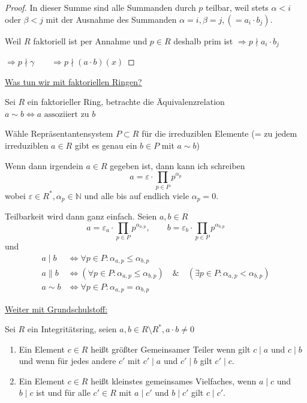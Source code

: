 \documentclass[12pt,parskip=full]{scrartcl}
\newcommand{\setN}{\mathbb{N}}
\newcommand{\heading}{\underline}
\theoremstyle{definition}
\theoremstyle{remark}
\begin{document}
\begin{proof}
		In dieser Summe sind alle Summanden durch $p$ teilbar, weil stets $\alpha < i$ oder $\beta < j$ mit der Ausnahme des Summanden $\alpha = i, \beta = j, (= a_i \cdot b_j)$.
		
		Weil $R$ faktoriell ist per Annahme und $p \in R$ deshalb prim ist $\Rightarrow p \nmid a_i \cdot b_j$
		
		$\Rightarrow p \nmid \gamma \qquad \Rightarrow p \nmid (a \cdot b)(x)$
	\end{proof}

	\heading{Was tun wir mit faktoriellen Ringen?}
	
	Sei $R$ ein faktorieller Ring, betrachte die Äquivalenzrelation $a \sim b \Leftrightarrow a \text{ assoziiert zu } b$
	
	Wähle Repräsentantensystem $P \subset R$ für die irreduziblen Elemente (= zu jedem irreduziblen $a \in R$ gibt es genau ein $b \in P$ mit $a \sim b$)
	
	Wenn dann irgendein $a \in R$ gegeben ist, dann kann ich schreiben
	\begin{equation*}
		a = \varepsilon \cdot \prod_{p \in P} p^{\alpha_p}
	\end{equation*}
	wobei $\varepsilon \in R^*, \alpha_p \in \setN$ und alle bis auf endlich viele $\alpha_p = 0$.
	
	Teilbarkeit wird dann ganz einfach. Seien $a, b \in R$
	\begin{equation*}
		a = \varepsilon_a \cdot \prod_{p \in P} p^{\alpha_{a,p}}, \qquad b = \varepsilon_b \cdot \prod_{p \in P} p^{\alpha_{b,p}}
	\end{equation*}
	und
	\begin{align*}
		a \mid b &\Leftrightarrow \forall p \in P: \alpha_{a,p} \leq \alpha_{b,p} \\
		a \parallel b &\Leftrightarrow (\forall p \in P: \alpha_{a,p} \leq \alpha_{b,p}) \quad\&\quad (\exists p \in P: \alpha_{a,p} < \alpha_{b,p})\\
		a \sim b &\Leftrightarrow \forall p \in P: \alpha_{a,p} = \alpha_{b,p}
	\end{align*}
	
	\heading{Weiter mit Grundschulstoff:}
	
	Sei $R$ ein Integritätsring, seien $a,b \in R \setminus R^*, a \cdot b \neq 0$
	
	\begin{enumerate}
		\item Ein Element $c \in R$ heißt größter Gemeinsamer Teiler wenn gilt $c \mid a$ und $c \mid b$ und wenn für jedes andere $c'$ mit $c' \mid a$ und $c' \mid b$ gilt $c' \mid c$.
		\item Ein Element $c \in R$ heißt kleinstes gemeinsames Vielfaches, wenn $a \mid c$ und $b \mid c$ ist und für alle $c' \in R$ mit $a \mid c'$ und $b \mid c'$ gilt $c \mid c'$.
	\end{enumerate}
\end{document}
